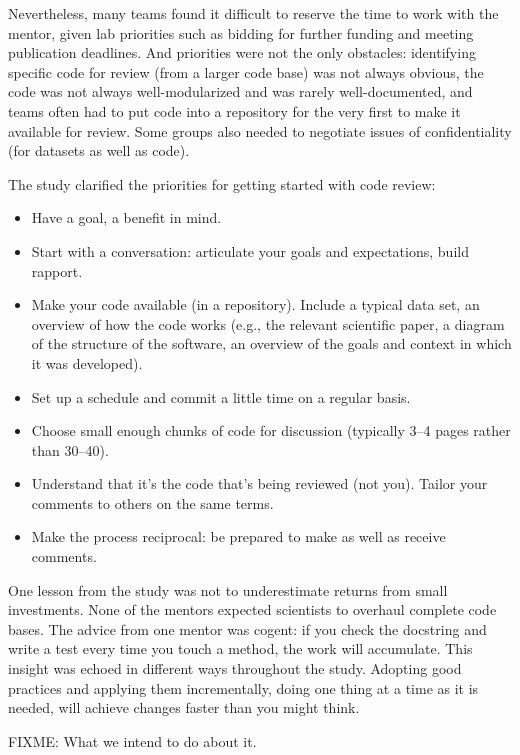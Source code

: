 \documentclass[10pt,twocolumn]{article}
\begin{document}
Nevertheless,
many teams found it difficult to reserve the time to work with the mentor,
given lab priorities such as bidding for further funding and meeting publication deadlines.
And priorities were not the only obstacles:
identifying specific code for review (from a larger code base) was not always obvious,
the code was not always well-modularized and was rarely well-documented,
and teams often had to put code into a repository for the very first to make it available for review.
Some groups also needed to negotiate issues of confidentiality (for datasets as well as code).

The study clarified the priorities for getting started with code review:

\begin{itemize}

\item Have a goal, a benefit in mind.

\item Start with a conversation:
articulate your goals and expectations, build rapport.

\item Make your code available (in a repository).
Include a typical data set, an overview of how the code works
(e.g.,
the relevant scientific paper,
a diagram of the structure of the software,
an overview of the goals and context in which it was developed).

\item Set up a schedule and commit a little time on a regular basis.

\item Choose small enough chunks of code for discussion (typically 3--4 pages rather than 30--40).

\item Understand that it's the code that's being reviewed (not you).
Tailor your comments to others on the same terms.

\item Make the process reciprocal:
be prepared to make as well as receive comments.

\end{itemize}

One lesson from the study was not to underestimate returns from small investments.
None of the mentors expected scientists to overhaul complete code bases.
The advice from one mentor was cogent:
if you check the docstring and write a test every time you touch a method,
the work will accumulate.
This insight was echoed in different ways throughout the study.
Adopting good practices and applying them incrementally,
doing one thing at a time as it is needed,
will achieve changes faster than you might think.

FIXME:  What we intend to do about it.

{\small


}
\end{document}
